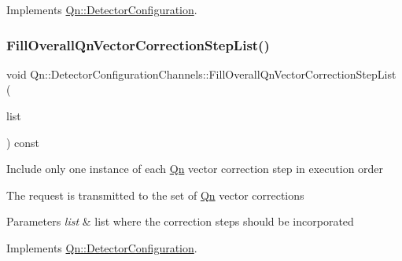 Implements \mbox{\hyperlink{classQn_1_1DetectorConfiguration_a76e173f938b886b5575597d9464698b4}{Qn\+::\+Detector\+Configuration}}.

\mbox{\label{classQn_1_1DetectorConfigurationChannels_a002931544421b46c9402aa7bdefcff51}} 
\subsubsection{\texorpdfstring{Fill\+Overall\+Qn\+Vector\+Correction\+Step\+List()}{FillOverallQnVectorCorrectionStepList()}}
{\footnotesize\ttfamily void Qn\+::\+Detector\+Configuration\+Channels\+::\+Fill\+Overall\+Qn\+Vector\+Correction\+Step\+List (\begin{DoxyParamCaption}\item[{T\+List $\ast$}]{list }\end{DoxyParamCaption}) const\hspace{0.3cm}{\ttfamily [virtual]}}

Include only one instance of each \mbox{\hyperlink{namespaceQn}{Qn}} vector correction step in execution order

The request is transmitted to the set of \mbox{\hyperlink{namespaceQn}{Qn}} vector corrections 
\begin{DoxyParams}{Parameters}
{\em list} & list where the correction steps should be incorporated \\
\hline
\end{DoxyParams}


Implements \mbox{\hyperlink{classQn_1_1DetectorConfiguration_ad71d83a2b0a5cee45bde15e936843e49}{Qn\+::\+Detector\+Configuration}}.

\mbox{\label{classQn_1_1DetectorConfigurationChannels_a393356a54937b18706b49b3e6748674f}} 
